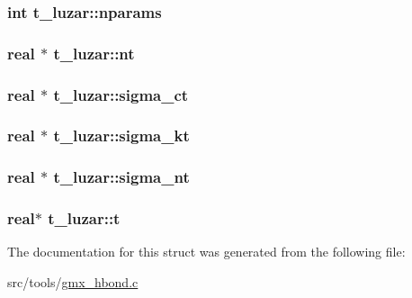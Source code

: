 \hypertarget{structt__luzar_ad33be09e400d85fb6a8785cbd041427e}{
\subsubsection[{nparams}]{\setlength{\rightskip}{0pt plus 5cm}int {\bf t\-\_\-luzar\-::nparams}}}\label{structt__luzar_ad33be09e400d85fb6a8785cbd041427e}
\hypertarget{structt__luzar_a6e5b00bc4ab6c2cb9e3fdb099cbf80fd}{
\subsubsection[{nt}]{\setlength{\rightskip}{0pt plus 5cm}real $\ast$ {\bf t\-\_\-luzar\-::nt}}}\label{structt__luzar_a6e5b00bc4ab6c2cb9e3fdb099cbf80fd}
\hypertarget{structt__luzar_a93cc8a49596f9e834f81f80d03f44760}{
\subsubsection[{sigma\-\_\-ct}]{\setlength{\rightskip}{0pt plus 5cm}real $\ast$ {\bf t\-\_\-luzar\-::sigma\-\_\-ct}}}\label{structt__luzar_a93cc8a49596f9e834f81f80d03f44760}
\hypertarget{structt__luzar_acfb3d4064870e19cf4a89a34f318115c}{
\subsubsection[{sigma\-\_\-kt}]{\setlength{\rightskip}{0pt plus 5cm}real $\ast$ {\bf t\-\_\-luzar\-::sigma\-\_\-kt}}}\label{structt__luzar_acfb3d4064870e19cf4a89a34f318115c}
\hypertarget{structt__luzar_a0b1a727979b43de0be3d501e0c77b14d}{
\subsubsection[{sigma\-\_\-nt}]{\setlength{\rightskip}{0pt plus 5cm}real $\ast$ {\bf t\-\_\-luzar\-::sigma\-\_\-nt}}}\label{structt__luzar_a0b1a727979b43de0be3d501e0c77b14d}
\hypertarget{structt__luzar_a0b4eb323584bb4af61b7aa25ad87119e}{
\subsubsection[{t}]{\setlength{\rightskip}{0pt plus 5cm}real$\ast$ {\bf t\-\_\-luzar\-::t}}}\label{structt__luzar_a0b4eb323584bb4af61b7aa25ad87119e}


\-The documentation for this struct was generated from the following file\-:\begin{DoxyCompactItemize}
\item 
src/tools/\hyperlink{gmx__hbond_8c}{gmx\-\_\-hbond.\-c}\end{DoxyCompactItemize}
